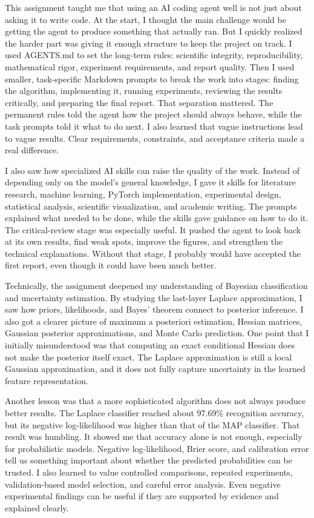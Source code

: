 This assignment taught me that using an AI coding agent well is not just about asking it to write code. At the start, I thought the main challenge would be getting the agent to produce something that actually ran. But I quickly realized the harder part was giving it enough structure to keep the project on track. I used AGENTS.md to set the long-term rules: scientific integrity, reproducibility, mathematical rigor, experiment requirements, and report quality. Then I used smaller, task-specific Markdown prompts to break the work into stages: finding the algorithm, implementing it, running experiments, reviewing the results critically, and preparing the final report. That separation mattered. The permanent rules told the agent how the project should always behave, while the task prompts told it what to do next. I also learned that vague instructions lead to vague results. Clear requirements, constraints, and acceptance criteria made a real difference.

I also saw how specialized AI skills can raise the quality of the work. Instead of depending only on the model\textquoteright{}s general knowledge, I gave it skills for literature research, machine learning, PyTorch implementation, experimental design, statistical analysis, scientific visualization, and academic writing. The prompts explained what needed to be done, while the skills gave guidance on how to do it. The critical-review stage was especially useful. It pushed the agent to look back at its own results, find weak spots, improve the figures, and strengthen the technical explanations. Without that stage, I probably would have accepted the first report, even though it could have been much better.

Technically, the assignment deepened my understanding of Bayesian classification and uncertainty estimation. By studying the last-layer Laplace approximation, I saw how priors, likelihoods, and Bayes\textquoteright{} theorem connect to posterior inference. I also got a clearer picture of maximum a posteriori estimation, Hessian matrices, Gaussian posterior approximations, and Monte Carlo prediction. One point that I initially misunderstood was that computing an exact conditional Hessian does not make the posterior itself exact. The Laplace approximation is still a local Gaussian approximation, and it does not fully capture uncertainty in the learned feature representation.

Another lesson was that a more sophisticated algorithm does not always produce better results. The Laplace classifier reached about 97.69\% recognition accuracy, but its negative log-likelihood was higher than that of the MAP classifier. That result was humbling. It showed me that accuracy alone is not enough, especially for probabilistic models. Negative log-likelihood, Brier score, and calibration error tell us something important about whether the predicted probabilities can be trusted. I also learned to value controlled comparisons, repeated experiments, validation-based model selection, and careful error analysis. Even negative experimental findings can be useful if they are supported by evidence and explained clearly.

